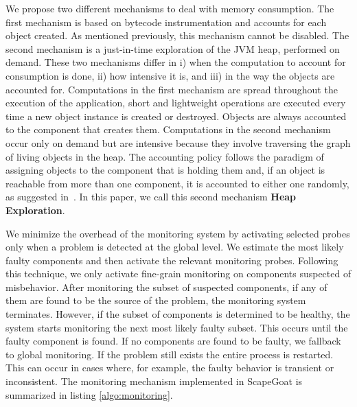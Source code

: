We propose two different mechanisms to deal with memory consumption.
The first mechanism is based on bytecode instrumentation and accounts for each object created. 
As mentioned previously, this mechanism cannot be disabled.
The second mechanism is a just-in-time exploration of the JVM heap, performed on demand.
These two mechanisms differ in i) when the computation to account for consumption is done, ii) how intensive it is, and iii) in the way the objects are accounted for.
Computations in the first mechanism are spread throughout the execution of the application, short and lightweight operations are executed every time a new object instance is created or destroyed.
Objects are always accounted to the component that creates them.
Computations in the second mechanism occur only on demand but are intensive because they involve traversing the graph of living objects in the heap.
The accounting policy follows the paradigm of assigning objects to the component that is holding them and, if an object is reachable from more than one component, it is accounted to either one randomly, as suggested in~\cite{Geoffray5270296}.
In this paper, we call this second mechanism \textbf{Heap Exploration}.

We minimize the overhead of the monitoring system by activating selected probes only when a problem is detected at the global level.
We estimate the most likely faulty components and then activate the relevant monitoring probes.
Following this technique, we only activate fine-grain monitoring on components suspected of misbehavior.
After monitoring the subset of suspected components, 
if any of them are found to be the source of the problem, the monitoring system terminates.
However, if the subset of components is determined to be healthy, the system starts monitoring the next most likely faulty subset.
This occurs until the faulty component is found.
If no components are found to be faulty, we fallback to global monitoring. If the problem still exists the entire process is restarted. This can occur in cases where, for example, the faulty behavior is transient or inconsistent.
The monitoring mechanism implemented in ScapeGoat is summarized in listing \ref{algo:monitoring}.


